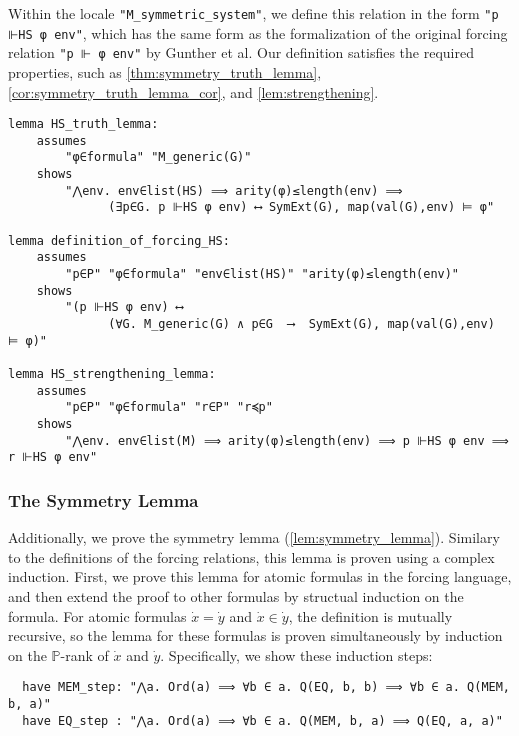 \documentclass{report}
\newenvironment{isaframe}{\begin{mdframed}[topline=false, rightline=false, bottomline=false]}{\end{mdframed}}
\begin{document}
Within the locale \texttt{"M\_symmetric\_system"},
we define this relation in the form \texttt{"p ⊩HS φ env"},
which has the same form as the formalization of the original forcing relation \texttt{"p ⊩ φ env"} by Gunther et al.
Our definition satisfies the required properties, such as \cref{thm:symmetry_truth_lemma}, \cref{cor:symmetry_truth_lemma_cor}, and \cref{lem:strengthening}.

\begin{isaframe}
\begin{verbatim}
lemma HS_truth_lemma:
    assumes 
        "φ∈formula" "M_generic(G)"
    shows 
        "⋀env. env∈list(HS) ⟹ arity(φ)≤length(env) ⟹ 
              (∃p∈G. p ⊩HS φ env) ⟷ SymExt(G), map(val(G),env) ⊨ φ"

lemma definition_of_forcing_HS:
    assumes
        "p∈P" "φ∈formula" "env∈list(HS)" "arity(φ)≤length(env)"
    shows
        "(p ⊩HS φ env) ⟷
              (∀G. M_generic(G) ∧ p∈G  ⟶  SymExt(G), map(val(G),env) ⊨ φ)"

lemma HS_strengthening_lemma:
    assumes 
        "p∈P" "φ∈formula" "r∈P" "r≼p"
    shows
        "⋀env. env∈list(M) ⟹ arity(φ)≤length(env) ⟹ p ⊩HS φ env ⟹ r ⊩HS φ env"
\end{verbatim}
\end{isaframe}


\subsubsection{The Symmetry Lemma}
Additionally, we prove the symmetry lemma (\cref{lem:symmetry_lemma}).
Similary to the definitions of the forcing relations, this lemma is proven using a complex induction.
First, we prove this lemma for atomic formulas in the forcing language, 
and then extend the proof to other formulas by structual induction on the formula.
For atomic formulas $\dot{x} = \dot{y}$ and $\dot{x} \in \dot{y}$, 
the definition is mutually recursive, so the lemma for these formulas is proven simultaneously
by induction on the $\mathbb{P}$-rank of $\dot{x}$ and $\dot{y}$.
Specifically, we show these induction steps:

\begin{isaframe}
\begin{verbatim}
  have MEM_step: "⋀a. Ord(a) ⟹ ∀b ∈ a. Q(EQ, b, b) ⟹ ∀b ∈ a. Q(MEM, b, a)"  
  have EQ_step : "⋀a. Ord(a) ⟹ ∀b ∈ a. Q(MEM, b, a) ⟹ Q(EQ, a, a)"   
\end{verbatim}
\end{isaframe}
\end{document}

